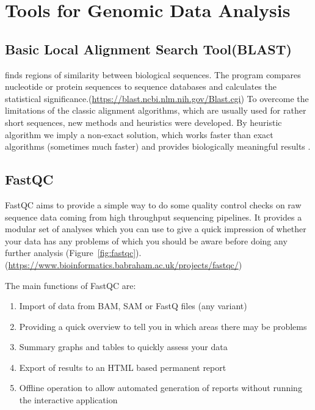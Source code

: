 \chapter{Tools for Genomic Data Analysis}\label{ch:ch4}

\section{Basic Local Alignment Search Tool(BLAST)}  
 finds regions of similarity between biological sequences. The program compares nucleotide or protein sequences to sequence databases and calculates the statistical significance.(\url{https://blast.ncbi.nlm.nih.gov/Blast.cgi}) 
To overcome the limitations of the classic alignment algorithms, which are usually used for rather short sequences, new methods and heuristics were developed. By heuristic algorithm we imply a non-exact solution, which works faster than exact algorithms (sometimes much faster) and provides biologically meaningful results \cite{seq2018}.
 

\section{FastQC} 
FastQC aims to provide a simple way to do some quality control checks on raw sequence data coming from high throughput sequencing pipelines. It provides a modular set of analyses which you can use to give a quick impression of whether your data has any problems of which you should be aware before doing any further analysis (Figure~\ref{fig:fastqc}).  (\url{https://www.bioinformatics.babraham.ac.uk/projects/fastqc/}) 

The main functions of FastQC are: 
\begin{enumerate}
	\item Import of data from BAM, SAM or FastQ files (any variant) 
	\item Providing a quick overview to tell you in which areas there may be problems
	\item Summary graphs and tables to quickly assess your data
	\item Export of results to an HTML based permanent report
	\item Offline operation to allow automated generation of reports without running the interactive application
	
\end{enumerate}

